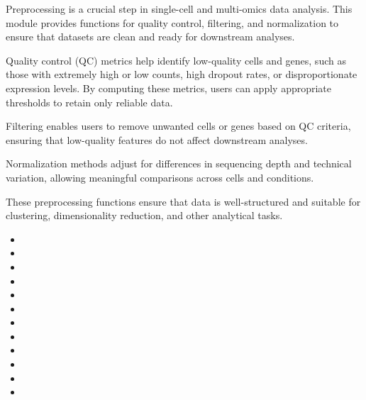 \documentclass[oneside]{memoir}
\begin{document}
\label{7637094317854373936}{}


Preprocessing is a crucial step in single-cell and multi-omics data analysis. This module provides functions for quality control, filtering, and normalization to ensure that datasets are clean and ready for downstream analyses.



Quality control (QC) metrics help identify low-quality cells and genes, such as those with extremely high or low counts, high dropout rates, or disproportionate expression levels. By computing these metrics, users can apply appropriate thresholds to retain only reliable data.



Filtering enables users to remove unwanted cells or genes based on QC criteria, ensuring that low-quality features do not affect downstream analyses.



Normalization methods adjust for differences in sequencing depth and technical variation, allowing meaningful comparisons across cells and conditions.



These preprocessing functions ensure that data is well-structured and suitable for clustering, dimensionality reduction, and other analytical tasks.


\begin{itemize}
\item {}
\item {}
\item {}
\item {}
\item {}
\item {}
\item {}
\item {}
\item {}
\item {}
\item {}
\item {}
\end{itemize}
\end{document}
